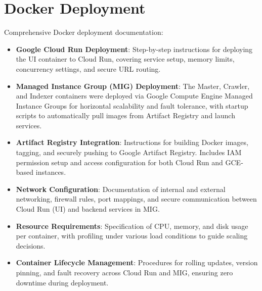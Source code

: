 \documentclass[12pt,a4paper]{report}
\begin{document}
\section{Docker Deployment}
Comprehensive Docker deployment documentation:
\begin{itemize}
    
    \item \textbf{Google Cloud Run Deployment}: Step-by-step instructions for deploying the UI container to Cloud Run, covering service setup, memory limits, concurrency settings, and secure URL routing.
    
    \item \textbf{Managed Instance Group (MIG) Deployment}: The Master, Crawler, and Indexer containers were deployed via Google Compute Engine Managed Instance Groups for horizontal scalability and fault tolerance, with startup scripts to automatically pull images from Artifact Registry and launch services.
    
    \item \textbf{Artifact Registry Integration}: Instructions for building Docker images, tagging, and securely pushing to Google Artifact Registry. Includes IAM permission setup and access configuration for both Cloud Run and GCE-based instances.
    
    \item \textbf{Network Configuration}: Documentation of internal and external networking, firewall rules, port mappings, and secure communication between Cloud Run (UI) and backend services in MIG.
    
    \item \textbf{Resource Requirements}: Specification of CPU, memory, and disk usage per container, with profiling under various load conditions to guide scaling decisions.
    
    \item \textbf{Container Lifecycle Management}: Procedures for rolling updates, version pinning, and fault recovery across Cloud Run and MIG, ensuring zero downtime during deployment.
\end{itemize}
\end{document}
